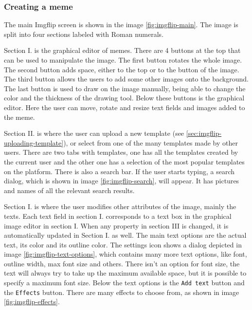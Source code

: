 \subsubsection{Creating a meme}

The main Imgflip screen is shown in the image \ref{fig:imgflip-main}. The image is split into four sections labeled with Roman numerals.


Section I. is the graphical editor of memes. There are 4 buttons at the top that can be used to manipulate the image. The first button rotates the whole image. The second button adds space, either to the top or to the button of the image. The third button allows the users to add some other images onto the background. The last button is used to draw on the image manually, being able to change the color and the thickness of the drawing tool. Below these buttons is the graphical editor. Here the user can move, rotate and resize text fields and images added to the meme.


Section II. is where the user can upload a new template (see \autoref{sec:imgflip-uploading-template}), or select from one of the many templates made by other users. There are two tabs with templates, one has all the templates created by the current user and the other one has a selection of the most popular templates on the platform. There is also a search bar. If the user starts typing, a search dialog, which is shown in image \ref{fig:imgflip-search}, will appear. It has pictures and names of all the relevant search results.


Section I. is where the user modifies other attributes of the image, mainly the texts. Each text field in section I. corresponds to a text box in the graphical image editor in section I. When any property in section III is changed, it is automatically updated in Section I. as well. The main text options are the actual text, its color and its outline color. The settings icon shows a dialog depicted in image \ref{fig:imgflip-text-options}, which contains many more text options, like font, outline width, max font size and others. There isn't an option for font size, the text will always try to take up the maximum available space, but it is possible to specify a maximum font size. Below the text options is the \texttt{Add text} button and the \texttt{Effects} button. There are many effects to choose from, as shown in image \ref{fig:imgflip-effects}.


